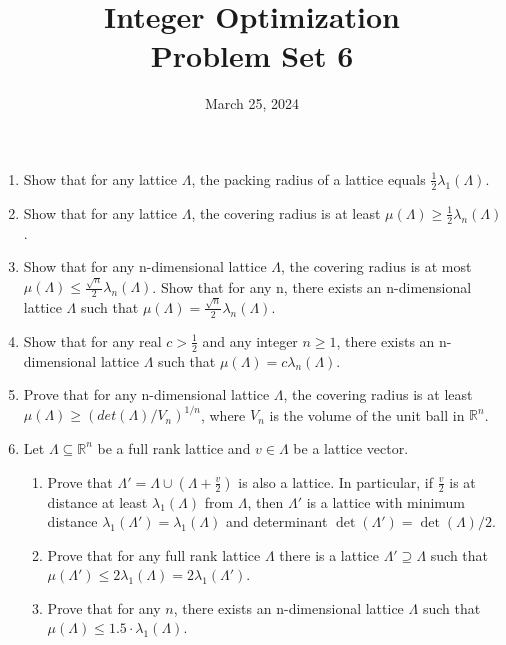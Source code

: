 \documentclass[11pt,a4paper]{article}
\title{Integer Optimization  \\ Problem Set 6 }
\date{ March 25, 2024}
\begin{document}
\maketitle 


\begin{enumerate}
\item Show that for any lattice $Λ$, the packing radius of a lattice equals $\frac{1}{2}λ_1(Λ)$.

\item Show that for any lattice $Λ$, the covering radius is at least $μ(Λ) ≥ \frac{1}{2} λ_n (Λ)$.

\item Show that for any n-dimensional lattice $Λ$, the covering radius is at most $
μ(Λ) ≤ \frac{\sqrt{n}}{2} λ_n(Λ)$. Show that for any n, there exists an n-dimensional lattice $Λ$ such that $μ(Λ) =\frac{\sqrt{n}}{2} λ_n(Λ)$.

\item Show that for any real $c > \frac{1}{2}$ and any integer $n ≥ 1$, there exists an n- dimensional lattice $Λ$ such that $μ(Λ) = cλ_n(Λ)$.

\item Prove that for any n-dimensional lattice $Λ$, the covering radius is at least $μ(Λ) ≥ (det(Λ)/V_n)^{1/n}$, where $V_n$ is the volume of the unit ball in $\mathbb{R}^n$.

\item Let $Λ ⊆ \mathbb{R}^n$ be a full rank lattice and $v ∈ Λ$ be a lattice vector. \begin{enumerate}
\item Prove that $Λ' = Λ ∪ (Λ + \frac{v}{2} )$ is also a lattice. In particular, if $\frac{v}{2}$ is at distance at least $λ_1 (Λ)$ from $Λ$, then $Λ'$ is a lattice with minimum distance $λ_1(Λ') = λ_1(Λ)$ and determinant $\det(Λ') = \det(Λ)/2$. 
\item Prove that for any full rank lattice $Λ$ there is a lattice $Λ' ⊇ Λ$ such that $μ(Λ') ≤ 2λ_1(Λ) = 2λ_1(Λ')$.
\item Prove that for any $n$, there exists an n-dimensional lattice $Λ$ such that $μ(Λ) ≤ 1.5 \cdot λ_1(Λ)$.
\end{enumerate}



\end{enumerate}


%
%


 
\end{document}

